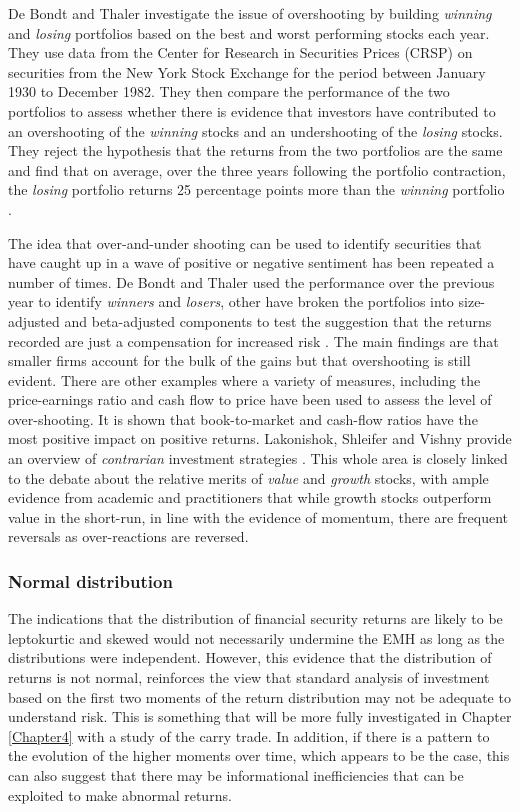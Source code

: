 \documentclass[12pt, a4paper, oneside]{article} %
\begin{document}
De Bondt and Thaler investigate the issue of overshooting by building \emph{winning} and \emph{losing} portfolios  based on the best and worst performing stocks each year.  They use data from the Center for Research in Securities Prices (CRSP) on securities from the New York Stock Exchange for the period between January 1930 to December 1982.  They then compare the performance of the two portfolios to assess whether there is evidence that investors have contributed to an overshooting of the \emph{winning} stocks and an undershooting of the \emph{losing} stocks.  They reject the hypothesis that the returns from the two portfolios are the same and find that on average, over the three years following the portfolio contraction, the \emph{losing} portfolio returns 25 percentage points more than the \emph{winning} portfolio \citep{DeBondtOver}.

The idea that over-and-under shooting can be used to identify securities that have caught up in a wave of positive or negative sentiment has been repeated a number of times.  De Bondt and Thaler used the performance over the previous year to identify \emph{winners} and \emph{losers}, other have broken the portfolios into size-adjusted and beta-adjusted components to test the suggestion that the returns recorded are just a compensation for increased risk  \citep{Chopra1992}.  The main findings are that smaller firms account for the bulk of the gains but that overshooting is still evident.  There are other examples where a variety of measures, including the price-earnings ratio \citep{BasuPE} and cash flow to price \citep{Chan1991} have been used to assess the level of over-shooting.  It is shown that book-to-market and cash-flow ratios have the most positive impact on positive returns.  Lakonishok, Shleifer and Vishny provide an overview of \emph{contrarian} investment strategies \citep{LakonishokContrarian}.  This whole area is closely linked to the debate about the relative merits of \emph{value} and \emph{growth} stocks, with ample evidence from academic and practitioners that while growth stocks outperform value in the short-run, in line with the evidence of momentum, there are frequent reversals as over-reactions are reversed.  

\subsubsection{Normal distribution}
The indications that the distribution of financial security returns are likely to be leptokurtic and skewed would not necessarily undermine the EMH as long as the distributions were independent.  However, this evidence that the distribution of returns is not normal, reinforces the view that standard analysis of investment based on the first two moments of the return distribution may not be adequate to understand risk.   This is something that will be more fully investigated in Chapter \ref{Chapter4} with a study of the carry trade.  In addition, if there is a pattern to the evolution of the higher moments over time, which appears to be the case, this can also suggest that there may be informational inefficiencies that can be exploited to make abnormal returns.  
\end{document}
